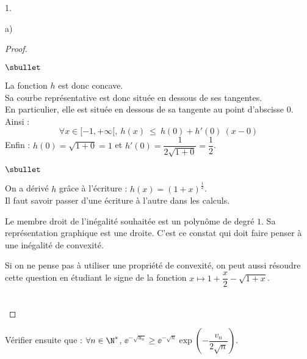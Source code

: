 \begin{noliste}{1.}
\begin{noliste}{a)}
\begin{proof}
\begin{noliste}{$\sbullet$}
      \item La fonction $h$ est donc concave.\\
        Sa courbe représentative est donc située en dessous de ses
        tangentes.\\
        En particulier, elle est située en dessous de sa tangente au
        point d'abscisse $0$. Ainsi :
        \[
        \forall x \in [-1,+\infty[, \ h(x) \ \leq \ h(0) + h'(0) \ (x-0)
        \]
        Enfin : $h(0) =\sqrt{1+0} = 1$ \quad et \quad $h'(0) =
        \dfrac{1}{2\sqrt{1+0}} = \dfrac{1}{2}$.%
        \conc{$\forall x\in[-1,+\infty[$, $\sqrt{1+x} \leq
          1 + \dfrac{x}{2}$}~\\[-1cm]
      \end{noliste}
      \begin{remark}%
        \begin{noliste}{$\sbullet$}
        \item On a dérivé $h$ grâce à l'écriture : $h(x) =
          (1+x)^{\frac{1}{2}}$.\\
          Il faut savoir passer d'une écriture à l'autre dans les
          calculs.
        \item Le membre droit de l'inégalité souhaitée est un polynôme
          de degré $1$. Sa représentation graphique est une droite.
          C'est ce constat qui doit faire penser à une inégalité de
          convexité.
        \item Si on ne pense pas à utiliser une propriété de
          convexité, on peut aussi résoudre cette question en étudiant
          le signe de la fonction $x \mapsto 1 + \dfrac{x}{2} -
          \sqrt{1+x}$.
        \end{noliste}
      \end{remark}~\\[-1.5cm]
    \end{proof}


    \newpage


  \item Vérifier ensuite que : $\forall n \in \N^{*}$,
    $\ee^{-\sqrt{u_n}} \geq \ee^{-\sqrt{n}} \exp\left(
      -\dfrac{v_n}{2\sqrt{n}} \right)$.


\end{noliste}
\end{noliste}
